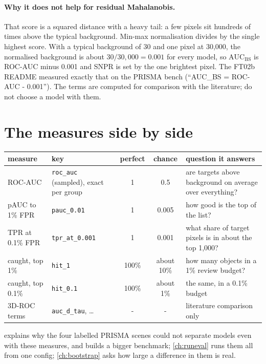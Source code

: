 \paragraph{Why it does not help for residual Mahalanobis.} That score is a squared distance with a heavy tail: a few
pixels sit hundreds of times above the typical background. Min-max normalisation divides by the single highest
score. With a typical background of 30 and one pixel at 30,000\tagA{}, the normalised background is about
$30/30{,}000 = 0.001$ for every model, so $\mathrm{AUC}_{\mathrm{BS}}$ is ROC-AUC minus 0.001 and SNPR is set by the
one brightest pixel. The FT02b README measured exactly that on the PRISMA bench (``AUC\_BS = ROC-AUC - 0.001''). The
terms are computed for comparison with the literature; do not choose a model with them.

\section{The measures side by side}\label{sec:measures:table}

\begin{center}
\small
\begin{tabular}{p{3.0cm}p{2.6cm}ccp{4.1cm}}
\toprule
measure & key & perfect & chance & question it answers \\
\midrule
ROC-AUC & \texttt{roc\_auc} (sampled), exact per group & 1 & 0.5 & are targets above background on average over everything? \\
pAUC to 1\% FPR & \texttt{pauc\_0.01} & 1 & 0.005 & how good is the top of the list? \\
TPR at 0.1\% FPR & \texttt{tpr\_at\_0.001} & 1 & 0.001 & what share of target pixels is in about the top 1,000? \\
caught, top 1\% & \texttt{hit\_1} & 100\% & about 10\% & how many objects in a 1\% review budget? \\
caught, top 0.1\% & \texttt{hit\_0.1} & 100\% & about 1\% & the same, in a 0.1\% budget \\
3D-ROC terms & \texttt{auc\_d\_tau}, \ldots & - & - & literature comparison only \\
\bottomrule
\end{tabular}
\end{center}

 explains why the four labelled PRISMA scenes could not separate models even with these
measures, and builds a bigger benchmark; \cref{ch:runeval} runs them all from one config; \cref{ch:bootstrap} asks
how large a difference in them is real.

